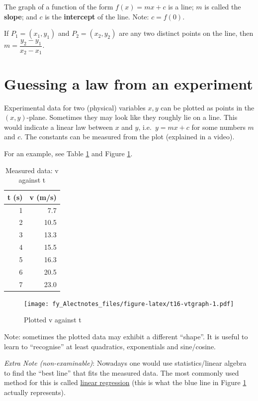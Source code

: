 \documentclass[
  12pt,
  oneside]{book}
\theoremstyle{definition}
\theoremstyle{definition}
\theoremstyle{definition}
\theoremstyle{definition}
\theoremstyle{remark}
\begin{document}
The graph of a function of the form \(f(x)=mx+c\) is a line; \(m\) is called the \textbf{slope}; and \(c\) is the \textbf{intercept} of the line. Note: \(c=f(0)\).

If \(P_1=(x_1,y_1)\) and \(P_2=(x_2,y_2)\) are any two distinct points on the line, then \(m=\dfrac{y_2-y_1}{x_2-x_1}\).

\section{Guessing a law from an experiment}\label{guessing-a-law-from-an-experiment}

Experimental data for two (physical) variables \(x,y\) can be plotted as points
in the \((x,y)\)-plane. Sometimes they may look like they roughly lie on a line.
This would indicate a linear law between \(x\) and \(y\), i.e.~\(y=mx+c\) for some numbers \(m\) and \(c\). The constants can be measured from the plot (explained in a video).

For an example, see Table \ref{tab:t16-vttable} and Figure \ref{fig:t16-vtgraph}.

\begin{table}

\caption{\label{tab:t16-vttable}Measured data: v against t}
\centering
\begin{tabular}[t]{r|r}
\hline
t (s) & v (m/s)\\
\hline
1 & 7.7\\
\hline
2 & 10.5\\
\hline
3 & 13.3\\
\hline
4 & 15.5\\
\hline
5 & 16.3\\
\hline
6 & 20.5\\
\hline
7 & 23.0\\
\hline
\end{tabular}
\end{table}

\begin{figure}
\centering
\texttt{[image: fy\_Alectnotes\_files/figure-latex/t16-vtgraph-1.pdf]}
\caption{\label{fig:t16-vtgraph}Plotted v against t}
\end{figure}

Note: sometimes the plotted data may exhibit a different ``shape''. It is useful
to learn to ``recognise'' at least quadratics, exponentials and sine/cosine.

\emph{Extra Note (non-examinable)}: Nowadays one would use statistics/linear algebra to find the ``best line'' that fits the measured data. The most commonly used method for this is called \href{https://en.wikipedia.org/wiki/Linear_regression}{linear regression} (this is what the blue line in Figure \ref{fig:t16-vtgraph} actually represents).
\end{document}
